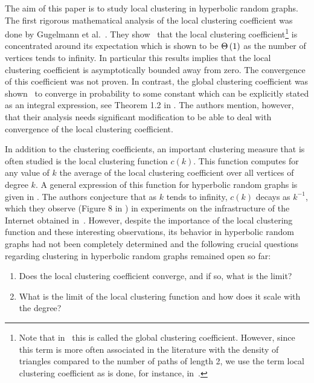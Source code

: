 The aim of this paper is to study local clustering in hyperbolic random graphs. The first rigorous mathematical analysis of the local clustering coefficient was done by Gugelmann et al.~\cite{gugelmann2012random}. They show~\cite[Theorem 2.1]{gugelmann2012random} that the local clustering coefficient\footnote{Note that in~\cite{gugelmann2012random} this is called the global clustering coefficient. However, since this term is more often associated in the literature with the density of triangles compared to the number of paths of length 2, we use the term local clustering coefficient as is done, for instance, in~\cite{candellero2016clustering}.} is concentrated around its expectation which is shown to be $\Theta\left(1\right)$ as the number of vertices tends to infinity. In particular this results implies that the local clustering coefficient is asymptotically bounded away from zero. The convergence of this coefficient was not proven. In contrast, the global clustering coefficient was shown~\cite{candellero2016clustering} to converge in probability to some constant which can be explicitly stated as an integral expression, see Theorem 1.2 in \cite{candellero2016clustering}. The authors mention, however, that their analysis needs significant modification to be able to deal with convergence of the local clustering coefficient.



In addition to the clustering coefficients, an important clustering measure that is often studied is the local clustering function $c(k)$. This function computes for any value of $k$ the average of the local clustering coefficient over all vertices of degree $k$. A general expression of this function for hyperbolic random graphs is given in \cite[Equation (59)]{krioukov2010hyperbolic}. The authors conjecture that as $k$ tends to infinity, $c(k)$ decays as $k^{-1}$, which they observe (Figure 8 in \cite{krioukov2010hyperbolic}) in experiments on the infrastructure of the Internet obtained in~\cite{claffy2009internet}. However, despite the importance of the local clustering function and these interesting observations, its behavior in hyperbolic random graphs had not been completely determined and the following crucial questions regarding clustering in hyperbolic random graphs remained open so far:
\begin{enumerate}[\upshape 1)]
\item Does the local clustering coefficient converge, and if so, what is the limit?
\item What is the limit of the local clustering function and how does it scale with the degree?
\end{enumerate}

